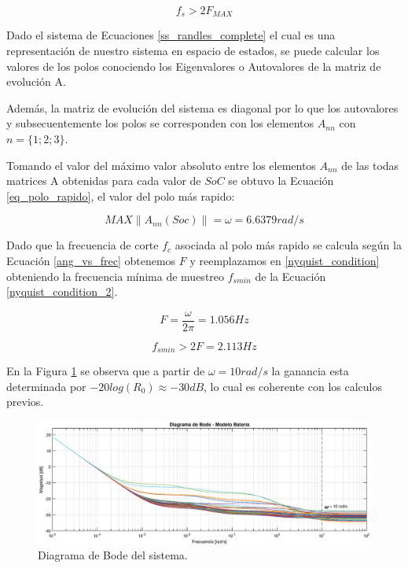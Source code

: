 \documentclass[10pt, a4paper]{report}
\begin{document}
\begin{equation}
	f_s > 2 F_{MAX}
	\label{nyquist_condition}
\end{equation}

Dado el sistema de Ecuaciones \ref{ss_randles_complete} el cual es una 
representación de nuestro sistema en espacio de estados, se puede calcular los 
valores de los polos conociendo los Eigenvalores o Autovalores de la matriz de 
evolución A.

Además, la matriz de evolución del sistema es diagonal por lo que los
autovalores y subsecuentemente los polos se corresponden con los elementos
$A_{nn}$ con $n=\{1;2;3\}$.

Tomando el valor del máximo valor absoluto entre los elementos $A_{nn}$ de las
todas matrices A obtenidas para cada valor de $SoC$ se obtuvo la Ecuación
\ref{eq_polo_rapido}, el valor del polo más rapido:

     \begin{equation}
     	MAX  \left \|A_{nn}(Soc)\right \| = \omega = 6.6379 rad/s
     	\label{eq_polo_rapido}
     \end{equation}

Dado que la frecuencia de corte $f_c$ asociada al polo más rapido se calcula
según la Ecuación \ref{ang_vs_frec} obtenemos $F$ y reemplazamos en
\ref{nyquist_condition} obteniendo la frecuencia mínima de muestreo $f_{smin}$ 
de la Ecuación \ref{nyquist_condition_2}.

\begin{equation}
	F = \frac{\omega}{2 \pi} = 1.056 Hz
	\label{ang_vs_frec}
\end{equation}

\begin{equation}
	f_{s min} > 2 F = 2.113 Hz
	\label{nyquist_condition_2}
\end{equation}

En la Figura \ref{system_bode} se observa que a partir de $\omega = 10 rad/s$ la
ganancia esta determinada por $-20log(R_{0})\approx-30dB$, lo cual es coherente
con los calculos previos.

\begin{figure}[h!]
	\begin{center}
		\includegraphics[width=1\textwidth]{bode_amplitud_w_grid.eps}
		\caption{Diagrama de Bode del sistema.}
		\label{system_bode}
	\end{center}
\end{figure}
\FloatBarrier
\end{document}
